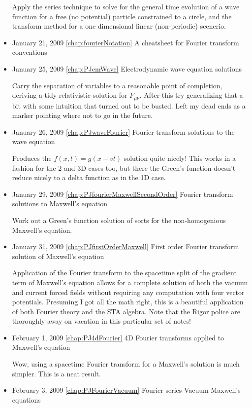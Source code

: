 \begin{itemize}
Apply the series technique to solve for the general time evolution of a wave function for a free (no potential) particle constrained to a circle, and the transform method for a one dimensional linear (non-periodic) scenerio. \item January 21, 2009 \ref{chap:fourierNotation} A cheatsheet for Fourier transform conventions

\item January 25, 2009 \ref{chap:PJemWave} Electrodynamic wave equation solutions

Carry the separation of variables to a reasonable point of completion, deriving a tidy relativistic solution for $F_{\mu\nu}$.  After this try generalizing that a bit with some intuition that turned out to be busted.  Left my dead ends as a marker pointing where not to go in the future. \item January 26, 2009 \ref{chap:PJwaveFourier} Fourier transform solutions to the wave equation

Produces the $f(x,t) = g( x - vt )$ solution quite nicely!  This works in a fashion for the 2 and 3D cases too, but there the Green's function doesn't reduce nicely to a delta function as in the 1D case. \item January 29, 2009 \ref{chap:PJfourierMaxwellSecondOrder} Fourier transform solutions to Maxwell's equation

Work out a Green's function solution of sorts for the non-homogenious Maxwell's equation. \item January 31, 2009 \ref{chap:PJfirstOrderMaxwell} First order Fourier transform solution of Maxwell's equation

Application of the Fourier transform to the spacetime split of the gradient term of Maxwell's equation allows for a complete solution of both the vacuum and current forced fields without requiring any computation with four vector potentials.  Presuming I got all the math right, this is a beautiful application of both Fourier theory and the STA algebra.  Note that the Rigor police are thoroughly away on vacation in this particular set of notes! \item February 1, 2009 \ref{chap:PJ4dFourier} 4D Fourier transforms applied to Maxwell's equation

Wow, using a spacetime Fourier transform for a Maxwell's solution is much simpler.  This is a neat result.\item February 3, 2009 \ref{chap:PJFourierVacuum} Fourier series Vacuum Maxwell's equations


\end{itemize}
